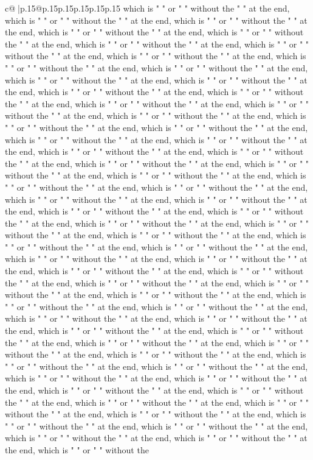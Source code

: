 \documentclass{article}
\begin{document}
{\begin{supertabular}{c@{$\;$}|p{.15\linewidth}@{}p{.15\linewidth}p{.15\linewidth}p{.15\linewidth}p{.15\linewidth}p{.15\linewidth}}
{{{which is " " or " " without the " " at the end, which is " " or " " without the " " at the end, which is " " or " " without the " " at the end, which is " " or " " without the " " at the end, which is " " or " " without the " " at the end, which is " " or " " without the " " at the end, which is " " or " " without the " " at the end, which is " " or " " without the " " at the end, which is " " or " " without the " " at the end, which is " " or " " without the " " at the end, which is " " or " " without the " " at the end, which is " " or " " without the " " at the end, which is " " or " " without the " " at the end, which is " " or " " without the " " at the end, which is " " or " " without the " " at the end, which is " " or " " without the " " at the end, which is " " or " " without the " " at the end, which is " " or " " without the " " at the end, which is " " or " " without the " " at the end, which is " " or " " without the " " at the end, which is " " or " " without the " " at the end, which is " " or " " without the " " at the end, which is " " or " " without the " " at the end, which is " " or " " without the " " at the end, which is " " or " " without the " " at the end, which is " " or " " without the " " at the end, which is " " or " " without the " " at the end, which is " " or " " without the " " at the end, which is " " or " " without the " " at the end, which is " " or " " without the " " at the end, which is " " or " " without the " " at the end, which is " " or " " without the " " at the end, which is " " or " " without the " " at the end, which is " " or " " without the " " at the end, which is " " or " " without the " " at the end, which is " " or " " without the " " at the end, which is " " or " " without the " " at the end, which is " " or " " without the " " at the end, which is " " or " " without the " " at the end, which is " " or " " without the " " at the end, which is " " or " " without the " " at the end, which is " " or " " without the " " at the end, which is " " or " " without the " " at the end, which is " " or " " without the " " at the end, which is " " or " " without the " " at the end, which is " " or " " without the " " at the end, which is " " or " " without the " " at the end, which is " " or " " without the " " at the end, which is " " or " " without the " " at the end, which is " " or " " without the " " at the end, which is " " or " " without the " " at the end, which is " " or " " without the " " at the end, which is " " or " " without the " " at the end, which is " " or " " without the " " at the end, which is " " or " " without the " " at the end, which is " " or " " without the " " at the end, which is " " or " " without the " " at the end, which is " " or " " without the " " at the end, which is " " or " " without the " " at the end, which is " " or " " without the " " at the end, which is " " or " " without the " " at the end, which is " " or " " without the " " at the end, which is " " or " " without the " " at the end, which is " " or " " without the " " at the end, which is " " or " " without the " " at the end, which is " " or " " without the " " at the end, which is " " or " " without the }}}
\end{supertabular}}
\end{document}
